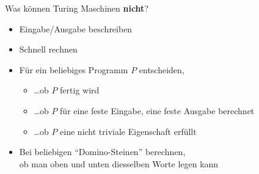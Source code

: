 \begin{frame}{Was können Turing Maschinen \textbf{nicht}?}
	\begin{itemize}
		\item Eingabe/Ausgabe beschreiben
		\pause
		\item Schnell rechnen
		\pause
		
		\vspace{1em}

		\item Für ein \textcolor{goetheblau}{beliebiges} Programm $P$ entscheiden, 
		\begin{itemize}
			\item \ldots ob $P$ fertig wird
			\pause
			\item \ldots ob $P$ für eine feste Eingabe, eine feste Ausgabe berechnet
			\pause
			\item \ldots ob $P$ eine nicht triviale Eigenschaft erfüllt
		\end{itemize}

		\vspace{1em}

		\item 
		Bei \textcolor{goetheblau}{beliebigen} \textquotedblleft Domino-Steinen\textquotedblright{} berechnen,\\ ob man oben und unten diesselben Worte legen kann
	\end{itemize}
	
	\begin{center}
	\end{center}
	
\end{frame}


